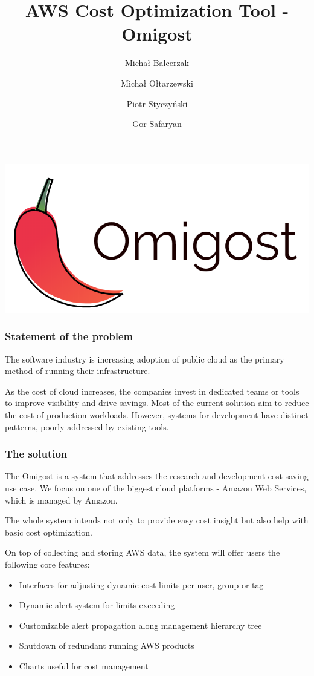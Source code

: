 \documentclass[licencjacka,en]{thesisclass}
\author{
  Michał Balcerzak
  \and
  Michał Ołtarzewski
  \and
  Piotr Styczyński
  \and
  Gor Safaryan
}
\title{AWS Cost Optimization Tool - Omigost}
\begin{document}
\includegraphics[width=\textwidth*\real{0.6}]{imgs/logo.png}

\subsubsection{Statement of the problem}

The software industry is increasing adoption of public cloud
as the primary method of running their infrastructure.

As the cost of cloud increases, the companies invest in dedicated teams
or tools to improve visibility and drive savings.
Most of the current solution aim to reduce the cost of production workloads.
However, systems for development have distinct patterns, poorly addressed by existing tools. 

\subsubsection{The solution}

The Omigost is a system that addresses the research and development cost saving use case.
We focus on one of the biggest cloud platforms - Amazon Web Services, which is managed by Amazon.

The whole system intends not only to provide easy cost insight but also help with basic cost optimization.

On top of collecting and storing AWS data, the system will offer users the following core features:

\begin{itemize}
  \item Interfaces for adjusting dynamic cost limits per user, group or tag
  \item Dynamic alert system for limits exceeding
  \item Customizable alert propagation along management hierarchy tree
  \item Shutdown of redundant running AWS products
  \item Charts useful for cost management
\end{itemize}
\end{document}
